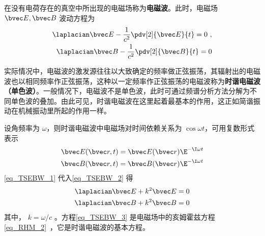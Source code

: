 
在没有电荷存在的真空中所出现的电磁场称为\textbf{电磁波}。此时，电磁场 $\bvec E,\bvec B$ 波动方程为
\begin{equation}\label{eq_TSEBW_2}
\begin{aligned}
\laplacian\bvec E-\frac{1}{c^2}\pdv[2]{\bvec E}{t}=0~,\\
\laplacian\bvec B-\frac{1}{c^2}\pdv[2]{\bvec B}{t}=0
\end{aligned}
\end{equation}

实际情况中，电磁波的激发源往往以大致确定的频率做正弦振荡，其辐射出的电磁波也以相同频率作正弦振荡，这种以一定频率作正弦振荡的电磁波称为\textbf{时谐电磁波（单色波）}。一般情况下，电磁波不是单色波，此时可通过频谱分析方法分解为不同单色波的叠加。由此可见，时谐电磁波在这里起着最基本的作用，这正如简谐振动在机械振动里所起的作用一样。

设角频率为 $\omega$，则时谐电磁波中电磁场对时间依赖关系为 $\cos\omega t$，可用复数形式表示
\begin{equation}\label{eq_TSEBW_1}
\begin{aligned}
\bvec E(\bvec r,t)=\bvec E(\bvec r)\E^{-\I\omega t}\\
\bvec B(\bvec r,t)=\bvec B(\bvec r)\E^{-\I\omega t}
\end{aligned}
\end{equation}
\autoref{eq_TSEBW_1} 代入\autoref{eq_TSEBW_2} 得
\begin{equation}\label{eq_TSEBW_3}
\begin{aligned}
\laplacian\bvec E+k^2\bvec E=0\\
\laplacian\bvec B+k^2\bvec B=0
\end{aligned}
\end{equation}
其中， $k=\omega/c$ 。方程\autoref{eq_TSEBW_3} 是电磁场中的亥姆霍兹方程\autoref{eq_RHM_2}~，它是时谐电磁波的基本方程。